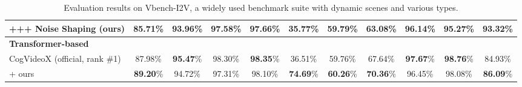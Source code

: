 \begin{table}[ht!]
{\begin{tabular}{|l|c|cccccc|ccc|}
        +++ Noise Shaping (ours)             & \textbf{85.71}\% & 93.96\% & 97.58\% & 97.66\% & 35.77\% & \textbf{59.79}\% & \textbf{63.08}\% & 96.14\% & 95.27\% & \textbf{93.32}\% \\
        \midrule
        \rowcolor{gray!15} \textbf{Transformer-based} & & & & & & & & & & \\
         CogVideoX (official, rank \#1)             & 87.98\% & \textbf{95.47}\% & 98.30\% & \textbf{98.35}\% & 36.51\% & 59.76\% & 67.64\% & \textbf{97.67}\% & \textbf{98.76}\% & 84.93\% \\
        + ours             & \textbf{89.20}\% & 94.72\% & 97.31\% & 98.10\% & \textbf{74.69}\% & \textbf{60.26}\% & \textbf{70.36}\% & 96.45\% & 98.08\% & \textbf{86.09}\% \\
        \bottomrule
      \end{tabular}
  }
  \vspace{-.2cm}
  \caption{Evaluation results on Vbench-I2V, a widely used benchmark suite with dynamic scenes and various types. }
  \label{tab:rebuttal_Vbench-I2V}
  \vspace{-.5cm}
\end{table}
